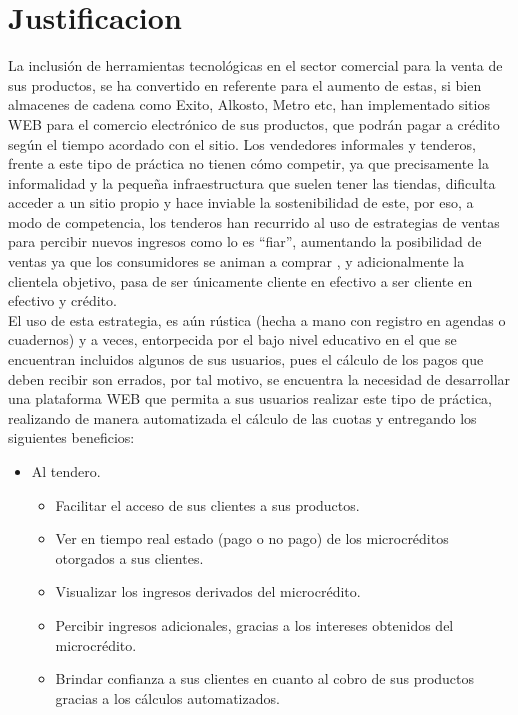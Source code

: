 \section{Justificacion}

{La inclusión de herramientas tecnológicas en el sector comercial para la venta de sus productos, se ha convertido en referente para el aumento de estas, si bien almacenes de cadena como Exito, Alkosto, Metro etc, han implementado sitios WEB para el comercio electrónico de sus productos, que podrán pagar a crédito según el tiempo acordado con el sitio.  Los vendedores informales y tenderos, frente a este tipo de práctica no tienen cómo competir, ya que precisamente la informalidad y la pequeña infraestructura que suelen tener las tiendas, dificulta acceder a un sitio propio y hace inviable la sostenibilidad de este, por eso, a modo de competencia, los tenderos han recurrido al uso de estrategias de ventas para percibir nuevos ingresos como lo es “fiar”, aumentando la posibilidad de ventas ya que los consumidores se animan a comprar \cite{creditArtJos}, y adicionalmente la clientela objetivo, pasa de ser únicamente cliente en efectivo a ser cliente en efectivo y crédito.\\
	
El uso de esta estrategia, es aún rústica (hecha  a mano con registro en agendas o cuadernos) y a veces, entorpecida por el bajo nivel educativo en el que se encuentran incluidos algunos de sus usuarios, pues el cálculo de los pagos que deben recibir son errados, por tal motivo, se encuentra la necesidad de desarrollar una plataforma WEB que permita a sus usuarios realizar este tipo de práctica, realizando de manera automatizada el cálculo de las cuotas y entregando los siguientes beneficios:

\begin{itemize}
	
	\item Al tendero.
	\begin{itemize}
		\item Facilitar el acceso de sus clientes a sus productos.
		\item Ver en tiempo real estado (pago o no pago) de los microcréditos otorgados a sus clientes.
		\item Visualizar los ingresos derivados del microcrédito.
		\item Percibir ingresos adicionales, gracias a los intereses obtenidos del microcrédito.
		\item Brindar confianza a sus clientes en cuanto al cobro de sus productos gracias a los cálculos automatizados.
	\end{itemize}


\end{itemize}}
